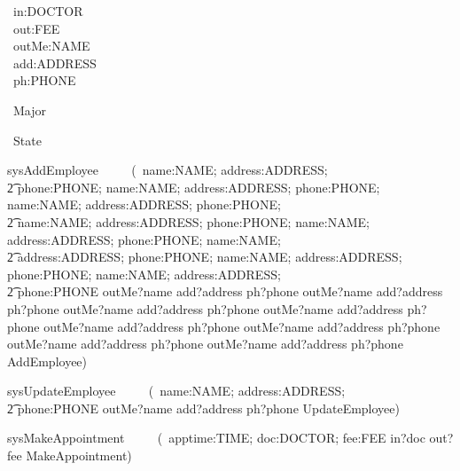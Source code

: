 \documentclass[10pt]{article}
\begin{document}
\begin{circus}
\circchannel\ in:DOCTOR                                                                             \\
\circchannel\ out:FEE                                                                               \\
\circchannel\ outMe:NAME                                                                            \\
\circchannel\ add:ADDRESS                                                                           \\
\circchannel\ ph:PHONE                                                                              \\
\end{circus}

\begin{circus}
\circprocess\ Major \circdef \circbegin
\end{circus}
\begin{circusaction}
\circstate\ State
\end{circusaction}

\begin{circusaction}
sysAddEmployee ~~\circdef~~ (\circvar\ name:NAME; address:ADDRESS;  \\
    \t2 phone:PHONE; name:NAME; address:ADDRESS; phone:PHONE; name:NAME; address:ADDRESS; phone:PHONE;  \\
    \t2 name:NAME; address:ADDRESS; phone:PHONE; name:NAME; address:ADDRESS; phone:PHONE; name:NAME;  \\
    \t2 address:ADDRESS; phone:PHONE; name:NAME; address:ADDRESS; phone:PHONE; name:NAME; address:ADDRESS;  \\
    \t2 phone:PHONE \circspot outMe?name add?address ph?phone outMe?name add?address ph?phone outMe?name add?address ph?phone outMe?name add?address ph?phone outMe?name add?address ph?phone outMe?name add?address ph?phone outMe?name add?address ph?phone outMe?name add?address ph?phone \lschexpract AddEmployee\rschexpract )  \\ 
\end{circusaction}

\begin{circusaction}
sysUpdateEmployee ~~\circdef~~ (\circvar\ name:NAME; address:ADDRESS;  \\
    \t2 phone:PHONE \circspot outMe?name add?address ph?phone \lschexpract UpdateEmployee\rschexpract )  \\ 
\end{circusaction}

\begin{circusaction}
sysMakeAppointment ~~\circdef~~ (\circvar\ apptime:TIME; doc:DOCTOR; fee:FEE \circspot in?doc out?fee \lschexpract MakeAppointment\rschexpract )  \\ 
\end{circusaction}

\begin{circus}
\circend
\end{circus}
\end{document}
